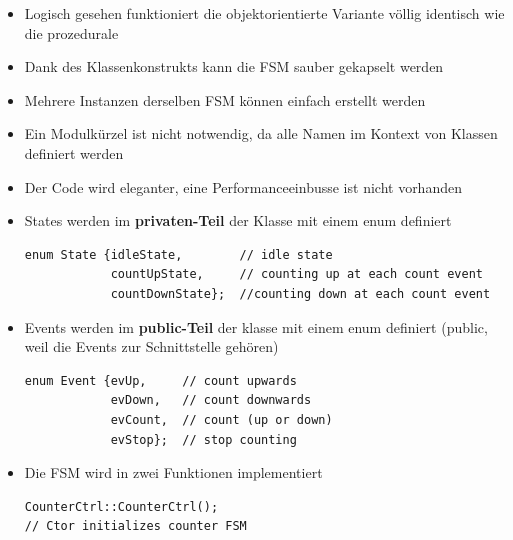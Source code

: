 \begin{itemize}
  \item Logisch gesehen funktioniert die objektorientierte Variante völlig
  identisch wie die prozedurale
  \item Dank des Klassenkonstrukts kann die FSM sauber gekapselt werden
  \item Mehrere Instanzen derselben FSM können einfach erstellt werden
  \item Ein Modulkürzel ist nicht notwendig, da alle Namen im Kontext von
  Klassen definiert werden
  \item Der Code wird eleganter, eine Performanceeinbusse ist nicht vorhanden
  \item States werden im \textbf{privaten-Teil} der Klasse mit einem enum
  definiert
\begin{lstlisting}
enum State {idleState,        // idle state 
            countUpState,     // counting up at each count event 
            countDownState};  //counting down at each count event
\end{lstlisting}
\item Events werden im \textbf{public-Teil} der klasse mit einem enum definiert
(public, weil die Events zur Schnittstelle gehören)
\begin{lstlisting}
enum Event {evUp,     // count upwards
            evDown,   // count downwards 
            evCount,  // count (up or down)
            evStop};  // stop counting
\end{lstlisting}
\item Die FSM wird in zwei Funktionen implementiert
\begin{lstlisting}
CounterCtrl::CounterCtrl(); 
// Ctor initializes counter FSM


\end{lstlisting}
\end{itemize}

